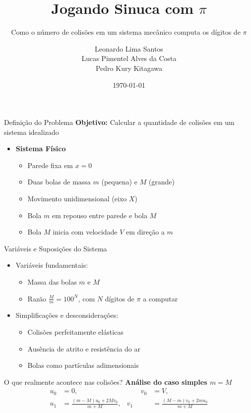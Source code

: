 \documentclass{beamer}
\title{Jogando Sinuca com $\pi$}
\subtitle{Como o número de colisões em um sistema mecânico computa os dígitos de $\pi$}
\author{Leonardo Lima Santos \\ Lucas Pimentel Alves da Costa \\ Pedro Kury Kitagawa}
\date{\today}
\begin{document}
\maketitle

\begin{frame}{Definição do Problema}
  \textbf{Objetivo:} Calcular a quantidade de colisões em um sistema idealizado
  \begin{itemize}
    \item \textbf{Sistema Físico}
      \begin{itemize}
        \item Parede fixa em $x = 0$
        \item Duas bolas de massa $m$ (pequena) e $M$ (grande)
        \item Movimento unidimensional (eixo $X$)
        \item Bola $m$ em repouso entre parede e bola $M$
        \item Bola $M$ inicia com velocidade $V$ em direção a $m$
      \end{itemize}
  \end{itemize}
\end{frame}

\begin{frame}{Variáveis e Suposições do Sistema}
  \begin{itemize}
    \item Variáveis fundamentais:
      \begin{itemize}
        \item Massa das bolas $m$ e $M$
        \item Razão $\tfrac{M}{m} = 100^N$, com $N$ dígitos de $\pi$ a computar
      \end{itemize}
    \item Simplificações e desconsiderações:
      \begin{itemize}
        \item Colisões perfeitamente elásticas
        \item Ausência de atrito e resistência do ar
        \item Bolas como partículas adimensionais
      \end{itemize}
  \end{itemize}
\end{frame}

\begin{frame}{O que realmente acontece nas colisões?}
  \textbf{Análise do caso simples $m = M$}
  \begin{equation*}
    \begin{alignedat}{2}
      u_0 &= 0,                           &\qquad v_0 &= V, \\
      u_1 &= \frac{(m - M)u_0 + 2Mv_0}{m + M}, & v_1 &= \frac{(M - m)v_0 + 2mu_0}{m + M}
    \end{alignedat}
  \end{equation*}
\end{frame}
\end{document}
